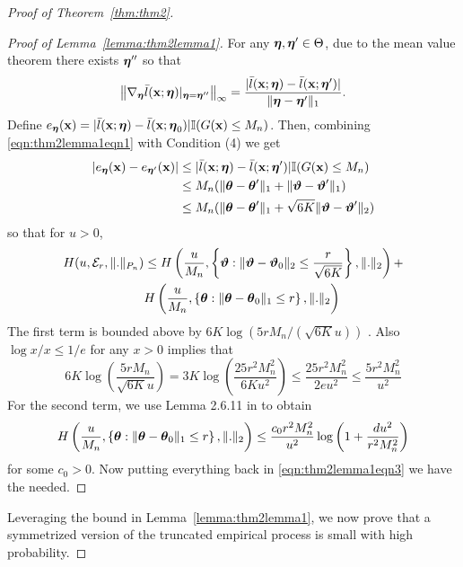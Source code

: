 \documentclass[11pt,letterpaper]{article}
\numberwithin{equation}{section}
\begin{document}
\begin{proof}[Proof of Theorem~\ref{thm:thm2}]
\begin{proof}[Proof of Lemma~\ref{lemma:thm2lemma1}]
For any ${\boldsymbol{\eta}}, {\boldsymbol{\eta}}' \in \Theta$, due to the mean value theorem there exists ${\boldsymbol{\eta}}''$ so that
%
\begin{align}\label{eqn:thm2lemma1eqn1}
\left\| \nabla_{\boldsymbol{\eta}} \bar l({\bf{x}}; {\boldsymbol{\eta}})|_{{\boldsymbol{\eta}} = {\boldsymbol{\eta}}''} \right\|_\infty =
\frac{| \bar l({\bf{x}}; {\boldsymbol{\eta}}) -  \bar l({\bf{x}}; {\boldsymbol{\eta}}')|}{\| {\boldsymbol{\eta}} - {\boldsymbol{\eta}}'\|_1}.
\end{align}
%
Define $e_{\boldsymbol{\eta}}({\bf{x}}) = | \bar l({\bf{x}}; {\boldsymbol{\eta}}) -  \bar l({\bf{x}}; {\boldsymbol{\eta}}_0)| {\mathbb{I}}(G({\bf{x}}) \leq M_n)$. Then, combining \eqref{eqn:thm2lemma1eqn1} with Condition (4) we get
%
\begin{align}
| e_{\boldsymbol{\eta}} ({\bf{x}}) - e_{{\boldsymbol{\eta}}'} ({\bf{x}}) | & \leq | \bar l({\bf{x}}; {\boldsymbol{\eta}}) -  \bar l({\bf{x}}; {\boldsymbol{\eta}}')| {\mathbb{I}}(G({\bf{x}}) \leq M_n) \notag\\
& \leq M_n( \| {\boldsymbol{\theta}} - {\boldsymbol{\theta}}'\|_1 + \| {\boldsymbol{\vartheta}} - {\boldsymbol{\vartheta}}' \|_1) \notag\\
& \leq M_n( \| {\boldsymbol{\theta}} - {\boldsymbol{\theta}}'\|_1 + \sqrt{6K} \| {\boldsymbol{\vartheta}} - {\boldsymbol{\vartheta}}' \|_2) \label{eqn:thm2lemma1eqn2}
\end{align}
%
so that for $u > 0$,
%
\begin{align}\label{eqn:thm2lemma1eqn3}
H(u, {\cal{E}}_r, \|.\|_{P_n}) & \leq
H\left( \frac{u}{M_n}, \left\{ {\boldsymbol{\vartheta}}: \| {\boldsymbol{\vartheta}} - {\boldsymbol{\vartheta}}_0 \|_2 \leq \frac{r}{\sqrt{6K}} \right\}, \|.\|_2 \right) + \notag\\
& H\left( \frac{u}{M_n}, \left\{{\boldsymbol{\theta}}: \| {\boldsymbol{\theta}} - {\boldsymbol{\theta}}_0 \|_1 \leq r \right\} , \|.\|_2 \right) 
\end{align}
%
The first term is bounded above by $6K \log(5r M_n/(\sqrt{6K}u))$ \citep{StadlerEtal10}. Also $\log x/x \leq 1/e$ for any $x > 0$ implies that
%
$$
6K \log \left( \frac{5 r M_n}{\sqrt{6K} u} \right) = 3K \log \left( \frac{25 r^2 M_n^2}{6K u^2} \right) \leq
\frac{25 r^2 M_n^2}{2e u^2} \leq \frac{5 r^2 M_n^2}{u^2}
$$
%
For the second term, we use Lemma 2.6.11 in \cite{vdvWellnerBook96} to obtain
%
$$
H\left( \frac{u}{M_n}, \left\{{\boldsymbol{\theta}}: \| {\boldsymbol{\theta}} - {\boldsymbol{\theta}}_0 \|_1 \leq r \right\} , \|.\|_2 \right) \leq
\frac{ c_0 r^2 M_n^2}{u^2} \log \left(1 + \frac{d u^2}{r^2 M_n^2} \right)
$$
%
for some $c_0 > 0$. Now putting everything back in \eqref{eqn:thm2lemma1eqn3} we have the needed.
\end{proof}

Leveraging the bound in Lemma~\ref{lemma:thm2lemma1}, we now prove that a symmetrized version of the truncated empirical process is small with high probability.


\end{proof}
\end{document}
